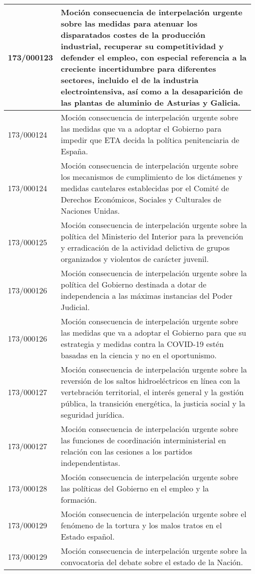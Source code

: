 {\begin{table}[H]
\begin{center}
\begin{tabularx}{\linewidth}{| l | X |}
\hline
173/000123 & Moción consecuencia de interpelación urgente sobre las medidas para atenuar los disparatados costes de la producción industrial, recuperar su competitividad y defender el empleo, con especial referencia a la creciente incertidumbre para diferentes sectores, incluido el de la industria electrointensiva, así como a la desaparición de las plantas de aluminio de Asturias y Galicia. \\
\hline
173/000124 & Moción consecuencia de interpelación urgente sobre las medidas que va a adoptar el Gobierno para impedir que ETA decida la política penitenciaria de España. \\
\hline
173/000124 & Moción consecuencia de interpelación urgente sobre los mecanismos de cumplimiento de los dictámenes y medidas cautelares establecidas por el Comité de Derechos Económicos, Sociales y Culturales de Naciones Unidas. \\
\hline
173/000125 & Moción consecuencia de interpelación urgente sobre la política del Ministerio del Interior para la prevención y erradicación de la actividad delictiva de grupos organizados y violentos de carácter juvenil. \\
\hline
173/000126 & Moción consecuencia de interpelación urgente sobre la política del Gobierno destinada a dotar de independencia a las máximas instancias del Poder Judicial. \\
\hline
173/000126 & Moción consecuencia de interpelación urgente sobre las medidas que va a adoptar el Gobierno para que su estrategia y medidas contra la COVID-19 estén basadas en la ciencia y no en el oportunismo. \\
\hline
173/000127 & Moción consecuencia de interpelación urgente sobre la reversión de los saltos hidroeléctricos en línea con la vertebración territorial, el interés general y la gestión pública, la transición energética, la justicia social y la seguridad jurídica. \\
\hline
173/000127 & Moción consecuencia de interpelación urgente sobre las funciones de coordinación interministerial en relación con las cesiones a los partidos independentistas. \\
\hline
173/000128 & Moción consecuencia de interpelación urgente sobre las políticas del Gobierno en el empleo y la formación. \\
\hline
173/000129 & Moción consecuencia de interpelación urgente sobre el fenómeno de la tortura y los malos tratos en el Estado español. \\
\hline
173/000129 & Moción consecuencia de interpelación urgente sobre la convocatoria del debate sobre el estado de la Nación. \\

\end{tabularx}
\end{center}
\end{table}}
